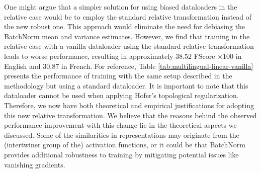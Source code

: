 \documentclass[../main.tex]{subfiles}
\begin{document}
\begin{table}[ht!]
\centering
{}
\caption{Linear vanilla dataloader (over two random seeds)}
\label{tab:multilingual-linear-vanilla}
\end{table}

One might argue that a simpler solution for using biased dataloaders in the relative case would be to employ the standard relative transformation instead of the new robust one. This approach would eliminate the need for debiasing the BatchNorm mean and variance estimates. However, we find that training in the relative case with a vanilla dataloader using the standard relative transformation leads to worse performance, resulting in approximately $38.52$ FScore $\times 100$ in English and $30.87$ in French. For reference, Table \ref{tab:multilingual-linear-vanilla} presents the performance of training with the same setup described in the methodology but using a standard dataloader. It is important to note that this dataloader cannot be used when applying Hofer's topological regularization.\\

Therefore, we now have both theoretical and empirical justifications for adopting this new relative transformation. We believe that the reasons behind the observed performance improvement with this change lie in the theoretical aspects we discussed. Some of the similarities in representations may originate from the (intertwiner group of the) activation functions, or it could be that BatchNorm provides additional robustness to training by mitigating potential issues like vanishing gradients.\\
\end{document}

